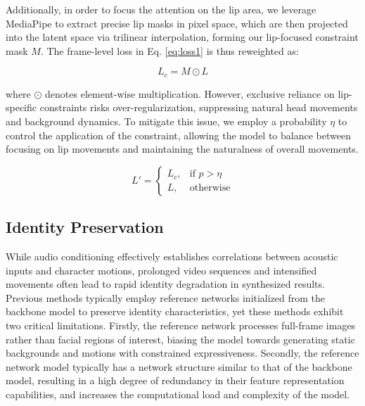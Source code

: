 \documentclass[sigconf]{acmart}
\begin{document}
Additionally, in order to focus the attention on the lip area, we leverage MediaPipe \cite{lugaresi2019mediapipe} to extract precise lip masks in pixel space, which are then projected into the latent space via trilinear interpolation, forming our lip-focused constraint mask $M$. The frame-level loss in Eq. \ref{eq:loss1} is thus reweighted as: 

\begin{equation}
    {L}_c = M \odot {L}
    \label{eq:loss2}
\end{equation}

where $\odot$ denotes element-wise multiplication. However, exclusive reliance on lip-specific constraints risks over-regularization, suppressing natural head movements and background dynamics. To mitigate this issue, we employ a probability $\eta$ to control the application of the constraint, allowing the model to balance between focusing on lip movements and maintaining the naturalness of overall movements. 

\begin{equation}
    L' = 
    \begin{cases}
    L_c, & \text{if } p > \eta \\
    L, & \text{otherwise}
    \end{cases}
    \label{eq:loss3}
\end{equation}


\subsection{Identity Preservation} \label{subsec:indentity}
While audio conditioning effectively establishes correlations between acoustic inputs and character motions, prolonged video sequences and intensified movements often lead to rapid identity degradation in synthesized results. Previous methods \cite{tian2024emo, jiang2024loopy, chen2024echomimic, cui2024hallo3} typically employ reference networks initialized from the backbone model to preserve identity characteristics, yet these methods exhibit two critical limitations. Firstly, the reference network processes full-frame images rather than facial regions of interest, biasing the model towards generating static backgrounds and motions with constrained expressiveness. Secondly, the reference network model typically has a network structure similar to that of the backbone model, resulting in a high degree of redundancy in their feature representation capabilities, and increases the computational load and complexity of the model. 
\end{document}
